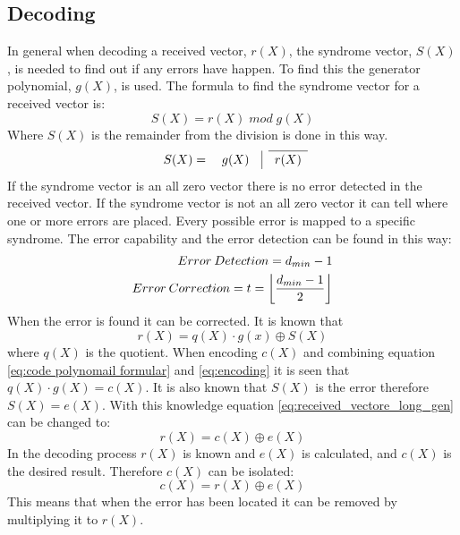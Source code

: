 \documentclass[Main]{subfiles}
\begin{document}
\subsection{Decoding}
In general when decoding a received vector, $ r(X) $, the syndrome vector, $ S(X) $, is needed to find out if any errors have happen.
To find this the generator polynomial, $ g(X) $, is used.
The formula to find the syndrome vector for a received vector is:
\begin{equation}
S(X) = r(X) \; mod \; g(X)
\label{syndrom formular}
\end{equation}
Where $ S(X) $ is the remainder from the division is done in this way. 
\[
\renewcommand\arraystretch{1.2}
\begin{array}{cccccccccccccccccc}
\cline{2-2}
 S(X) = \quad g(X) \quad \vline & r(X) \\
\end{array}
\]
If the syndrome vector is an all zero vector there is no error detected in the received vector.
If the syndrome vector is not an all zero vector it can tell where one or more errors are placed.
Every possible error is mapped to a specific syndrome.
The error capability and the error detection can be found in this way:
\begin{eqnarray}
Error \: Detection = d_{min}-1\\
Error \: Correction = t = \floor*{\frac{d_{min}-1}{2}}
\end{eqnarray}
When the error is found it can be corrected.
It is known that
\begin{equation}
\label{eq:received_vectore_long_gen}
r(X) = q(X) \cdot g(x) \oplus S(X)
\end{equation}
where $q(X)$ is the quotient.
When encoding $c(X)$ and combining equation \ref{eq:code polynomail formular} and \ref{eq:encoding} it is seen that $q(X) \cdot g(X) = c(X)$.
It is also known that $ S(X) $ is the error therefore $S(X) = e(X)$.
With this knowledge equation \ref{eq:received_vectore_long_gen} can be changed to:
\begin{equation}
r(X) = c(X) \oplus e(X)
\end{equation}
In the decoding process $ r(X) $ is known and $ e(X) $ is calculated, and $ c(X) $ is the desired result.
Therefore $ c(X) $ can be isolated:
\begin{equation}
c(X) = r(X) \oplus e(X)
\end{equation}
This means that when the error has been located it can be removed by multiplying it to $ r(X) $.
\end{document}

